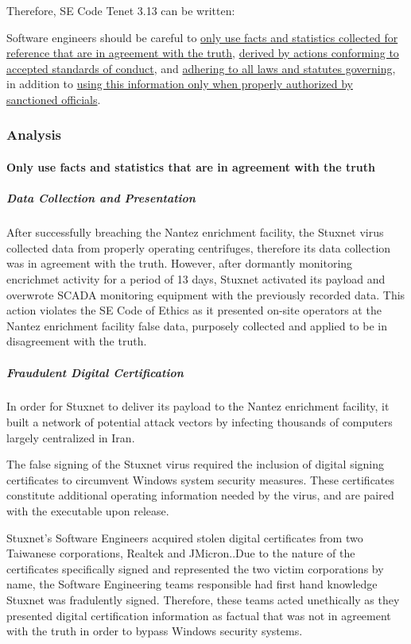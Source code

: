 \documentclass[12pt]{article}
\begin{document}
\begin{multicols}{2}
Therefore, SE Code Tenet 3.13 can be written:
\begin{framed}
Software engineers should be careful to \ul{only use facts and statistics collected for reference that are in agreement with the truth}, \ul{derived by actions conforming to accepted standards of conduct}, and \ul{adhering to all laws and statutes governing}, in addition to \ul{using this information only when properly authorized by sanctioned officials}.
\end{framed}

\subsubsection{Analysis}

\paragraph{Only use facts and statistics that are in agreement with the truth}

\subparagraph{Data Collection and Presentation}

After successfully breaching the Nantez enrichment facility, the Stuxnet virus collected data from properly operating centrifuges, therefore its data collection was in agreement with the truth. However, after dormantly monitoring encrichmet activity for a period of 13 days, Stuxnet activated its payload and overwrote SCADA monitoring equipment with the previously recorded data. This action violates the SE Code of Ethics as it presented on-site operators at the Nantez enrichment facility false data, purposely collected and applied to be in disagreement with the truth.

\subparagraph{Fraudulent Digital Certification}

In order for Stuxnet to deliver its payload to the Nantez enrichment facility, it built a network of potential attack vectors by infecting thousands of computers largely centralized in Iran.

The false signing of the Stuxnet virus required the inclusion of digital signing certificates to circumvent Windows system security measures. These certificates constitute additional operating information needed by the virus, and are paired with the executable upon release.

Stuxnet's Software Engineers acquired stolen digital certificates from two Taiwanese corporations, Realtek and JMicron.\cite{signedUsingCertificates}.Due to the nature of the certificates specifically signed and represented the two victim corporations by name, the Software Engineering teams responsible had first hand knowledge Stuxnet was fradulently signed. Therefore, these teams acted unethically as they presented digital certification information as factual that was not in agreement with the truth in order to bypass Windows security systems. 


\end{multicols}
\end{document}
